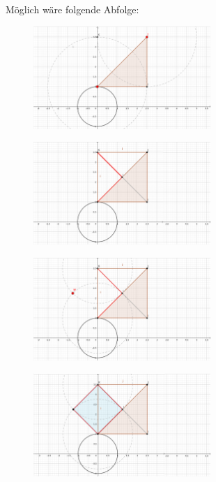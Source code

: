\documentclass[
	12pt, %
	german, %
]{fphw}
\begin{document}
Möglich wäre folgende Abfolge:
\begin{figure}[H]
	\centering
	\includegraphics[width=0.6\textwidth]{Negativ-TriangulaturDesKreises2.png}
\end{figure}
\begin{figure}[H]
	\centering
	\includegraphics[width=0.6\textwidth]{Negativ-TriangulaturDesKreises5.png}
\end{figure}\begin{figure}[H]
	\centering
	\includegraphics[width=0.6\textwidth]{Negativ-TriangulaturDesKreises6.png}
\end{figure}\begin{figure}[H]
	\centering
	\includegraphics[width=0.6\textwidth]{Negativ-TriangulaturDesKreises7.png}
\end{figure}
\end{document}
